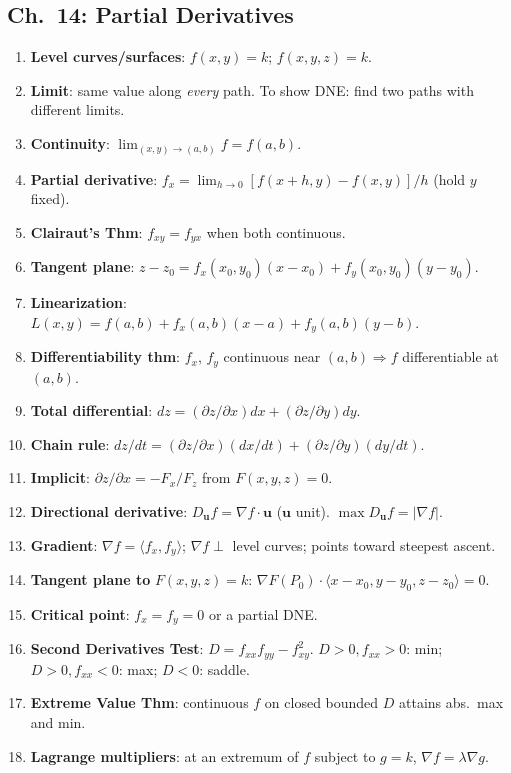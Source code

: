 \documentclass[12pt]{article}
\theoremstyle{compact}
\renewcommand{\vec}[1]{\mathbf{#1}}
\begin{document}
\subsection{Ch.\ 14: Partial Derivatives}
\begin{enumerate}[label=\textbf{14.\arabic*.},leftmargin=*,itemsep=1pt]
  \item \textbf{Level curves/surfaces}: $f(x,y)=k$; $f(x,y,z)=k$.
  \item \textbf{Limit}: same value along \emph{every} path. To show DNE: find two paths with different limits.
  \item \textbf{Continuity}: $\lim_{(x,y)\to(a,b)}f=f(a,b)$.
  \item \textbf{Partial derivative}: $f_x=\lim_{h\to0}[f(x+h,y)-f(x,y)]/h$ (hold $y$ fixed).
  \item \textbf{Clairaut's Thm}: $f_{xy}=f_{yx}$ when both continuous.
  \item \textbf{Tangent plane}: $z-z_0=f_x(x_0,y_0)(x-x_0)+f_y(x_0,y_0)(y-y_0)$.
  \item \textbf{Linearization}: $L(x,y)=f(a,b)+f_x(a,b)(x-a)+f_y(a,b)(y-b)$.
  \item \textbf{Differentiability thm}: $f_x$, $f_y$ continuous near $(a,b)\Rightarrow f$ differentiable at $(a,b)$.
  \item \textbf{Total differential}: $dz=(\partial z/\partial x)dx+(\partial z/\partial y)dy$.
  \item \textbf{Chain rule}: $dz/dt=(\partial z/\partial x)(dx/dt)+(\partial z/\partial y)(dy/dt)$.
  \item \textbf{Implicit}: $\partial z/\partial x=-F_x/F_z$ from $F(x,y,z)=0$.
  \item \textbf{Directional derivative}: $D_{\vec{u}}f=\nabla f\cdot\vec{u}$ ($\vec{u}$ unit). $\max D_{\vec{u}}f=|\nabla f|$.
  \item \textbf{Gradient}: $\nabla f=\langle f_x,f_y\rangle$; $\nabla f\perp$ level curves; points toward steepest ascent.
  \item \textbf{Tangent plane to} $F(x,y,z)=k$: $\nabla F(P_0)\cdot\langle x-x_0,y-y_0,z-z_0\rangle=0$.
  \item \textbf{Critical point}: $f_x=f_y=0$ or a partial DNE.
  \item \textbf{Second Derivatives Test}: $D=f_{xx}f_{yy}-f_{xy}^2$. $D>0,f_{xx}>0$: min; $D>0,f_{xx}<0$: max; $D<0$: saddle.
  \item \textbf{Extreme Value Thm}: continuous $f$ on closed bounded $D$ attains abs.\ max and min.
  \item \textbf{Lagrange multipliers}: at an extremum of $f$ subject to $g=k$, $\nabla f=\lambda\nabla g$.
\end{enumerate}
\end{document}
